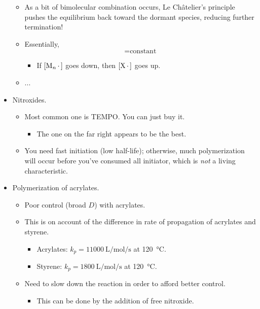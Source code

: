 \documentclass[../notes.tex]{subfiles}
\begin{document}
\begin{itemize}
\begin{itemize}
        \item As a bit of bimolecular combination occurs, Le Ch\^{a}telier's principle pushes the equilibrium back toward the dormant species, reducing further termination!
        \item Essentially,
        \begin{equation*}
            [\ce{M_n}*][\ce{X*}] = \text{constant}
        \end{equation*}
        \begin{itemize}
            \item If $[\ce{M_n*}]$ goes down, then $[\ce{X*}]$ goes up.
        \end{itemize}
        \item ...
    \end{itemize}
    \item Nitroxides.
    \begin{itemize}
        \item Most common one is TEMPO. You can just buy it.
        \begin{itemize}
            \item The one on the far right appears to be the best.
        \end{itemize}
        \item You need fast initiation (low half-life); otherwise, much polymerization will occur before you've consumed all initiator, which is \emph{not} a living characteristic.
    \end{itemize}
    \item Polymerization of acrylates.
    \begin{itemize}
        \item Poor control (broad $D$) with acrylates.
        \item This is on account of the difference in rate of propagation of acrylates and styrene.
        \begin{itemize}
            \item Acrylates: $k_p=\SI{11000}{\liter\per\mole\per\second}$ at \SI{120}{\celsius}.
            \item Styrene: $k_p=\SI{1800}{\liter\per\mole\per\second}$ at \SI{120}{\celsius}.
        \end{itemize}
        \item Need to slow down the reaction in order to afford better control.
        \begin{itemize}
            \item This can be done by the addition of free nitroxide.

\end{itemize}
\end{itemize}
\end{itemize}
\end{document}
